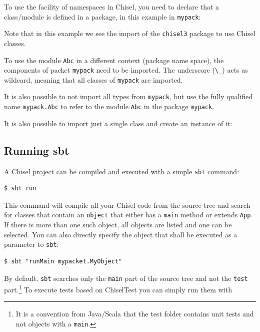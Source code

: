 \documentclass[%
    10pt,
    headinclude, footexclude,
    openright, %
    notitlepage,
    cleardoubleempty,
    headsepline,
    pointlessnumbers,
    bibtotoc, idxtotoc,
    ]{scrbook}
\newcommand{\code}[1]{{\lstinline[basicstyle=\small\ttfamily]{#1}}}
\newcommand{\codefoot}[1]{{\lstinline[basicstyle=\footnotesize\ttfamily]{#1}}}
\begin{document}
To use the facility of namespaces in Chisel, you need to declare that a class/module
is defined in a package, in this example in \code{mypack}:


\noindent Note that in this example we see the import of the \code{chisel3} package
to use Chisel classes.

To use the module \code{Abc} in a different context (package name space),
the components of packet \code{mypack} need to be imported. The underscore
(\code{\_}) acts as wildcard, meaning that all classes of \code{mypack} are imported.


\noindent It is also possible to not import all types from \code{mypack},
but use the fully qualified name \code{mypack.Abc} to refer to the module
\code{Abc} in the package \code{mypack}.


\noindent It is also possible to import just a single class and create an instance of it:



\subsection{Running sbt}

A Chisel project can be compiled and executed with a simple \code{sbt} command:

\begin{verbatim}
$ sbt run
\end{verbatim}

This command will compile all your Chisel code from the source tree and search
for classes that contain an \code{object} that either has a \code{main} method or
extends \code{App}. If there is more than one such object, all objects are listed and
one can be selected.
You can also directly specify the object that shall be executed as a parameter to \code{sbt}:

\begin{verbatim}
$ sbt "runMain mypacket.MyObject"
\end{verbatim}

By default, \code{sbt} searches only the \code{main} part of the source tree and not
the \code{test} part.\footnote{It is a convention from Java/Scala that the test folder contains
unit tests and not objects with a \codefoot{main}.}
To execute tests based on ChiselTest you can simply run them with
\end{document}
